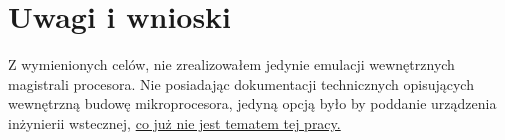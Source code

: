 \chapter{Uwagi i wnioski}
	
	Z  wymienionych celów, nie zrealizowałem jedynie emulacji wewnętrznych magistrali procesora. Nie posiadając dokumentacji technicznych opisujących wewnętrzną budowę mikroprocesora, jedyną opcją było by poddanie urządzenia inżynierii wstecznej, \underline{co już nie jest tematem tej pracy.}
	
